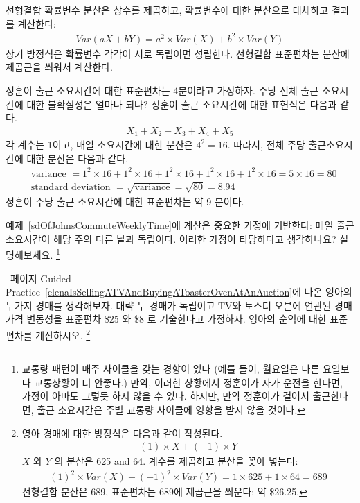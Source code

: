 \begin{termBox}{
선형결합 확률변수 분산은 상수를 제곱하고, 확률변수에 대한 분산으로 대체하고 결과를 계산한다:
\begin{align*}
Var(aX + bY) = a^2\times Var(X) + b^2\times Var(Y)
\end{align*}
상기 방정식은 확률변수 각각이 서로 독립이면 성립한다. 선형결합 표준편차는 분산에 제곱근을 씌워서 계산한다.}
\end{termBox}

\begin{example}{정훈이 출근 소요시간에 대한 표준편차는 4분이라고 가정하자. 주당 전체 출근 소요시간에 대한 불확실성은 얼마나 되나?} \label{sdOfJohnsCommuteWeeklyTime}
정훈이 출근 소요시간에 대한 표현식은 다음과 같다.
\begin{align*}
X_1 + X_2 + X_3 + X_4 + X_5
\end{align*}
각 계수는 1이고, 매일 소요시간에 대한 분산은 $4^2=16$. 따라서, 전체 주당 출근소요시간에 대한 분산은 다음과 같다.
\begin{align*}
&\text{variance }= 1^2 \times  16 + 1^2 \times  16 + 1^2 \times  16 + 1^2 \times  16 + 1^2 \times  16 = 5\times 16 = 80 \\
&\text{standard deviation } = \sqrt{\text{variance}} = \sqrt{80} = 8.94
\end{align*}
정훈이 주당 출근 소요시간에 대한 표준편차는 약 9 분이다.
\end{example}

\begin{exercise}

예제~\ref{sdOfJohnsCommuteWeeklyTime}에 계산은 중요한 가정에 기반한다: 매일 출근 소요시간이 해당 주의 다른 날과 독립이다. 이러한 가정이 타당하다고 생각하나요? 설명해보세요.
\footnote{교통량 패턴이 매주 사이클을 갖는 경향이 있다 (예를 들어, 월요일은 다른 요일보다 교통상황이 더 안좋다.) 만약, 이러한 상황에서 정훈이가 자가 운전을 한다면, 가정이 아마도 그렇듯 하지 않을 수 있다. 하지만, 만약 정훈이가 걸어서 출근한다면, 출근 소요시간은 주별 교통량 사이클에 영향을 받지 않을 것이다.}
\end{exercise}

\begin{exercise}\label{elenaIsSellingATVAndBuyingAToasterOvenAtAnAuctionVariability}
\pageref{elenaIsSellingATVAndBuyingAToasterOvenAtAnAuction}~페이지 Guided Practice~\ref{elenaIsSellingATVAndBuyingAToasterOvenAtAnAuction}에 나온 영아의 두가지 경매를 생각해보자. 대략 두 경매가 독립이고 TV와 토스터 오븐에 연관된 경매 가격 변동성을 표준편차 \$25 와 \$8 로 기술한다고 가정하자. 영아의 순익에 대한 표준편차를 계산하시오.
\footnote{영아 경매에 대한 방정식은 다음과 같이 작성된다.
\begin{align*}
(1)\times X + (-1)\times Y
\end{align*}
$X$ 와 $Y$ 의 분산은 625 and 64. 계수를 제곱하고 분산을 꽂아 넣는다:
\begin{align*}
(1)^2\times Var(X) + (-1)^2\times Var(Y) = 1\times 625 + 1\times 64 = 689
\end{align*}
선형결합 분산은 689, 표준편차는 689에 제곱근을 씌운다: 약 \$26.25.}
\end{exercise}

